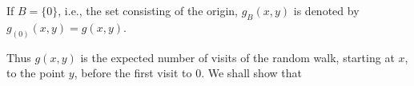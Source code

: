 If $B = \{0\}$, i.e., the set consisting of the origin, $g_B(x,y)$ is denoted by $g_{(0)}(x,y) = g(x,y)$.

Thus $g(x,y)$ is the expected number of visits of the random walk, starting at $x$, to the point $y$, before the first visit to 0. We shall show that